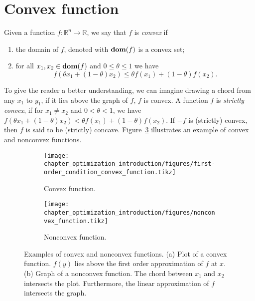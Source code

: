 \section{Convex function\label{sec:convex_function}}
Given a function $f: \mathbb{R}^n \rightarrow \mathbb{R}$, we say that $f$ is \emph{convex} if
\begin{enumerate}
    \item the domain of $f$, denoted with $\operatorname*{\textbf{dom}}(f)$ is a convex set;
    \item for all $x_1,x_2 \in \operatorname*{\textbf{dom}}(f)$  and $0 \le \theta \le 1$ we have 
    \begin{equation}
        f(\theta x_1 + ( 1- \theta) x_2) \le \theta f(x_1) + (1-\theta) f(x_2).
    \end{equation}
\end{enumerate}
To give the reader a better understanding, we can imagine drawing a chord from any $x_1$ to $y_1$, if it lies above the graph of $f$, $f$ is convex.
A function $f$ is \emph{strictly convex}, if for $x_1 \ne x_2$ and $0<\theta<1$, we have $f(\theta x_1 + ( 1- \theta) x_2) < \theta f(x_1) + (1-\theta) f(x_2)$. If $-f$ is (strictly) convex, then $f$ is said to be (strictly) concave. Figure~\ref{fig:convex_nonconvex_functions} illustrates an example of convex and nonconvex functions.

\begin{figure}[t]
\centering
    \begin{subfigure}[b]{0.48\textwidth}
        \centering
        \texttt{[image: chapter\_optimization\_introduction/figures/first-order\_condition\_convex\_function.tikz]}
        \caption{Convex function.}
        \label{fig:first-order_condition_convex_function}
    \end{subfigure}
    \hfill
    \begin{subfigure}[b]{0.48\textwidth}
        \centering
        \texttt{[image: chapter\_optimization\_introduction/figures/nonconvex\_function.tikz]}
        \caption{Nonconvex function.}
        \label{fig:nonconvex_function}
    \end{subfigure}
	\caption[Examples of convex and nonconvex functions]{Examples of convex and nonconvex functions. (a) Plot of a convex function. $f(y)$ lies above the first order approximation of $f$ at $x$. (b) Graph of a nonconvex function. The chord between $x_1$ and $x_2$ intersects the plot. Furthermore, the linear approximation of $f$ intersects the graph.}
	\label{fig:convex_nonconvex_functions}
\end{figure}

